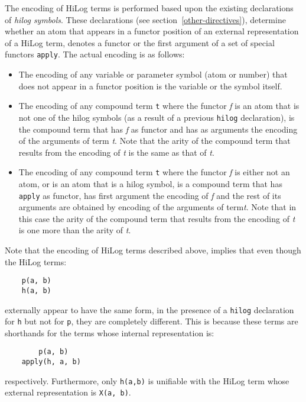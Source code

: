 The encoding of HiLog terms is performed based upon the existing declarations
of {\em hilog symbols}.  These declarations (see section~\ref{other-directives}),
determine whether an atom that appears in a functor position of an external 
representation of a HiLog term, denotes a functor or the first argument of a 
set of special functors {\tt apply}.  The actual encoding is as follows:
\begin{itemize}
\item	The encoding of any variable or parameter symbol (atom or number) that
	does not appear in a functor position is the variable or the symbol
	itself.
\item	The encoding of any compound term {\tt t} where the functor {\em f}
	is an atom that is not one of the hilog symbols (as a result of a
	previous {\tt hilog} declaration), is the compound term that has
	{\em f} as functor and has as arguments the encoding of the arguments
	of term {\em t}.  Note that the arity of the compound term that results
	from the encoding of {\em t} is the same as that of {\em t}.
\item	The encoding of any compound term {\tt t} where the functor {\em f}
	is either not an atom, or is an atom that is a hilog symbol, is a 
	compound term that has {\tt apply} as functor, has first argument
	the encoding of {\em f} and the rest of its arguments are obtained
	by encoding of the arguments of term{\em t}.  Note that in this case
	the arity of the compound term that results from the encoding of
	{\em t} is one more than the arity of {\em t}.
\end{itemize}

Note that the encoding of HiLog terms described above, implies that even
though the HiLog terms:
\begin{center}
\begin{minipage}{1.0in}
\begin{verbatim}
	p(a, b)
	h(a, b)
\end{verbatim}
\end{minipage}
\end{center}
externally appear to have the same form, in the presence of a {\tt hilog}
declaration for {\tt h} but not for {\tt p}, they are completely different.
This is because these terms are shorthands for the terms whose internal 
representation is: 
\begin{center}
\begin{minipage}{1.2in}
\begin{verbatim}
	    p(a, b)
	apply(h, a, b)
\end{verbatim}
\end{minipage}
\end{center}
respectively.  Furthermore, only {\tt h(a,b)} is unifiable with the HiLog term
whose external representation is {\tt X(a, b)}.

